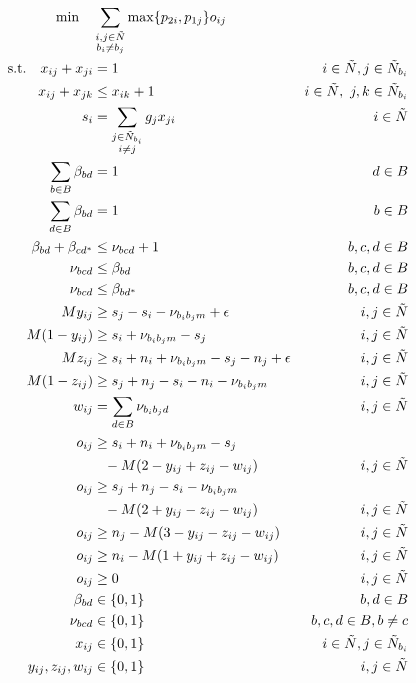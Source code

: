 \documentclass{scrreprt}
\begin{document}
\begin{align}
    \text{min}\quad &\sum_{\substack{i,j\in\tilde{N}\\b_i\neq b_j}} 
            \max\{p_{2i},p_{1j}\}o_{ij} \label{objfunc}\\
    \text{s.t.} \quad x_{ij} + x_{ji} &= 1 &i\in\tilde{N}, j\in\tilde{N}_{b_i} 
            \label{con:reflex}\\
    x_{ij} + x_{jk} &\leq x_{ik} + 1 &i\in\tilde{N},\,\, j,k\in\tilde{N}_{b_i} 
            \label{con:transitiv} \\
    s_i &= \sum_{\substack{j\in\tilde{N}_{b_i}\\i\neq j}} g_j x_{ji} &i\in\tilde{N} 
            \label{con:start} \\
	\sum_{b\in B}\beta_{bd} &= 1 &d\in B \label{con:binpos} \\
	\sum_{d\in B}\beta_{bd} &= 1 &b\in B \label{con:binpos2} \\
	\beta_{bd} + \beta_{cd^*} &\leq \nu_{bcd} + 1 &b,c,d\in B \label{con:nu} \\
	\nu_{bcd} &\leq \beta_{bd} &b,c,d\in B \label{con:nurev} \\
    \nu_{bcd} &\leq \beta_{bd^*} &b,c,d\in B \label{con:nurev2} \\
    My_{ij} &\geq s_j - s_i - \nu_{b_ib_jm} + \epsilon &i,j\in\tilde{N} \label{con:y1}\\
    M(1-y_{ij}) &\geq s_i + \nu_{b_ib_jm} - s_j &i,j\in\tilde{N} \\
    Mz_{ij} &\geq s_i + n_i + \nu_{b_ib_jm} - s_j - n_j + \epsilon &i,j\in\tilde{N} \\
    M(1-z_{ij}) &\geq s_j + n_j - s_i - n_i - \nu_{b_ib_jm} &i,j\in\tilde{N} \\
	w_{ij} &= \sum_{d\in B} \nu_{b_ib_jd} &i,j\in\tilde{N} \label{con:w} \\
    o_{ij} &\geq s_i + n_i + \nu_{b_ib_jm} - s_j \notag \\
		   &\phantom{\geq} - M(2-y_{ij}+z_{ij}-w_{ij}) &i,j\in\tilde{N} \label{con:o1} \\
    o_{ij} &\geq s_j + n_j - s_i - \nu_{b_ib_jm} \notag \\
           &\phantom{\geq} - M(2+y_{ij}-z_{ij}-w_{ij}) &i,j\in\tilde{N} \label{con:o2} \\
    o_{ij} &\geq n_j - M(3-y_{ij}-z_{ij}-w_{ij}) &i,j\in\tilde{N} \\
	o_{ij} &\geq n_i - M(1+y_{ij}+z_{ij}-w_{ij}) &i,j\in\tilde{N} \label{con:o4} \\
    o_{ij} &\geq 0 &i,j\in\tilde{N} \\
	\beta_{bd} &\in \{0,1\} &b,d\in B \\
	\nu_{bcd} &\in \{0,1\} &b,c,d\in B, b\neq c \\
    x_{ij} &\in \{0,1\} &i\in\tilde{N},j\in\tilde{N}_{b_i} \\
    y_{ij},z_{ij},w_{ij} &\in \{0,1\} &i,j\in\tilde{N}
\end{align}
\end{document}
